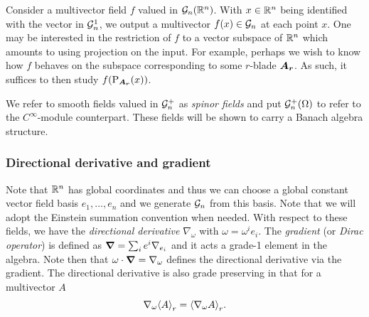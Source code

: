 \begin{example}
    Consider a multivector field $f$ valued in $\mathcal{G}_n(\mathbb{R}^n)$.  With $x\in \mathbb{R}^n$ being identified with the vector in $\mathcal{G}_n^1$, we output a multivector $f(x) \in \mathcal{G}_n$ at each point $x$.  One may be interested in the restriction of $f$ to a vector subspace of $\mathbb{R}^n$ which amounts to using projection on the input.  For example, perhaps we wish to know how $f$ behaves on the subspace corresponding to some $r$-blade $\boldsymbol{A_r}$.  As such, it suffices to then study $f(\operatorname{P}_{\boldsymbol{A_r}}(x))$.  
\end{example}

We refer to smooth fields valued in $\mathcal{G}_n^+$ as \emph{spinor fields} and put $\mathcal{G}_n^+(\Omega)$ to refer to the $C^\infty$-module counterpart. These fields will be shown to carry a Banach algebra structure. 


\subsubsection{Directional derivative and gradient}

Note that $\mathbb{R}^n$ has global coordinates and thus we can choose a global constant vector field basis $e_1,\dots,e_n$ and we generate $\mathcal{G}_n$ from this basis. Note that we will adopt the Einstein summation convention when needed. With respect to these fields, we have the \emph{directional derivative} $\nabla_\omega$ with $\omega = \omega^i e_i$. The \emph{gradient} (or \emph{Dirac operator}) is defined as $\boldsymbol{\nabla} = \sum_{i} e^i \nabla_{e_i}$ and it acts a grade-1 element in the algebra.   Note then that $\omega \cdot \boldsymbol{\nabla} = \nabla_\omega$ defines the directional derivative via the gradient. The directional derivative is also grade preserving in that for a multivector $A$
\begin{equation}
\nabla_\omega \proj{r}{A} = \proj{r}{\nabla_\omega A}.
\end{equation}


